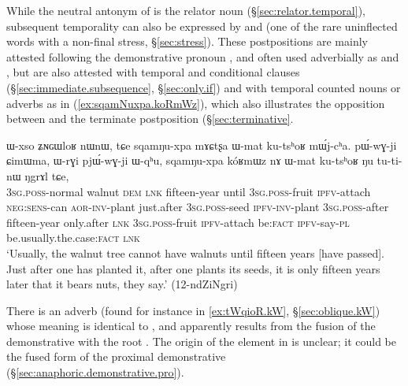 While the neutral antonym of  is the relator noun  (§\ref{sec:relator.temporal}), subsequent temporality can also be expressed by  and  (one of the rare uninflected words with a non-final stress, §\ref{sec:stress}). These postpositions are mainly attested following the demonstrative pronoun , and often used adverbially as  and , but are also attested with temporal and conditional clauses (§\ref{sec:immediate.subsequence}, §\ref{sec:only.if}) and with temporal counted nouns or adverbs as in (\ref{ex:sqamNuxpa.koRmWz}), which also illustrates the opposition between  and the terminate postposition  (§\ref{sec:terminative}. 

\begin{exe}
\ex \label{ex:sqamNuxpa.koRmWz}
\gll ɯ-xso ʑɴɢɯloʁ nɯnɯ, tɕe sqamŋu-xpa mɤɕtʂa ɯ-mat ku-tsʰoʁ mɯ́j-cʰa. pɯ́-wɣ-ji ɕimɯma, ɯ-rɣi pjɯ́-wɣ-ji ɯ-qʰu,  sqamŋu-xpa kóʁmɯz nɤ ɯ-mat ku-tsʰoʁ ŋu tu-ti-nɯ ŋgrɤl tɕe,  \\
\textsc{3sg}.\textsc{poss}-normal walnut  \textsc{dem} \textsc{lnk} fifteen-year until \textsc{3sg}.\textsc{poss}-fruit \textsc{ipfv}-attach \textsc{neg}:\textsc{sens}-can \textsc{aor}-\textsc{inv}-plant just.after \textsc{3sg}.\textsc{poss}-seed \textsc{ipfv}-\textsc{inv}-plant \textsc{3sg}.\textsc{poss}-after fifteen-year only.after \textsc{lnk} \textsc{3sg}.\textsc{poss}-fruit \textsc{ipfv}-attach be:\textsc{fact} \textsc{ipfv}-say-\textsc{pl} be.usually.the.case:\textsc{fact} \textsc{lnk} \\
\glt `Usually, the walnut tree cannot have walnuts until fifteen years [have passed]. Just after one has planted it, after one plants its seeds, it is only fifteen years later that it bears nuts, they say.' (12-ndZiNgri)
\end{exe}

There is an adverb  (found for instance in \ref{ex:tWqioR.kW}, §\ref{sec:oblique.kW}) whose meaning is identical to , and apparently results from the fusion of the demonstrative  with the root . The origin of the  element in  is unclear; it could be the fused form of the proximal demonstrative  (§\ref{sec:anaphoric.demonstrative.pro}).

